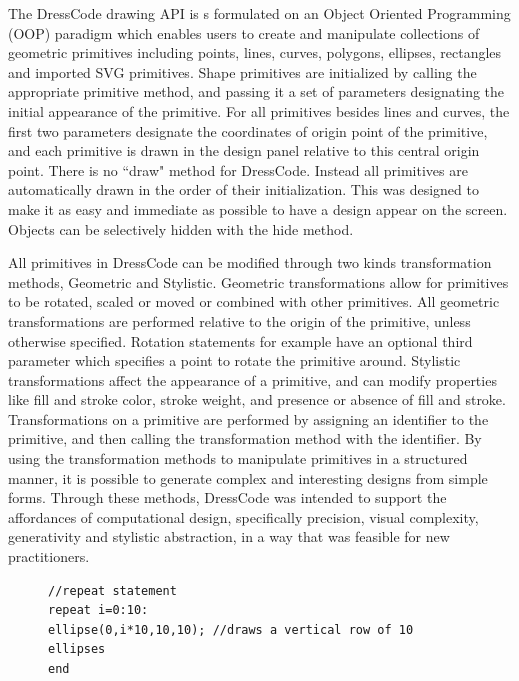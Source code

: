 \documentclass{sigchi}
\begin{document}
The DressCode drawing API is s formulated on an Object Oriented Programming (OOP) paradigm which enables users to create and manipulate collections of geometric primitives including points, lines, curves, polygons, ellipses, rectangles and imported SVG primitives. Shape primitives are initialized by calling the appropriate primitive method, and passing it a set of parameters designating the initial appearance of the primitive. For all primitives besides lines and curves, the first two parameters designate the coordinates of origin point of the primitive, and each primitive is drawn in the design panel relative to this central origin point. There is no ``draw" method for DressCode. Instead all primitives are automatically drawn in the order of their initialization. This was designed to make it as easy and immediate as possible to have a design appear on the screen. Objects can be selectively hidden with the hide method. 
 
All primitives in DressCode can be modified through two kinds transformation methods, Geometric and Stylistic. Geometric transformations allow  for primitives to be rotated, scaled or moved or combined with other primitives. All geometric transformations are performed relative to the origin of the primitive, unless otherwise specified. Rotation statements for example have an optional third parameter which specifies a point to rotate the primitive around. Stylistic transformations affect the appearance of a primitive, and can modify properties like fill and stroke color, stroke weight, and presence or absence of fill and stroke. Transformations on a primitive are performed by assigning an identifier to the primitive, and then calling the transformation method with the identifier. By using the transformation methods to manipulate primitives in a structured manner, it is possible to generate complex and interesting designs from simple forms. Through these methods, DressCode was intended to support the affordances of computational design, specifically precision, visual complexity, generativity and stylistic abstraction, in a way that was feasible for new practitioners.

 \begin{center}
\begin{figure}
\begin{lstlisting}
//repeat statement
repeat i=0:10:
ellipse(0,i*10,10,10); //draws a vertical row of 10 ellipses
end
\end{lstlisting}
\end{figure}
\end{center}
\end{document}

